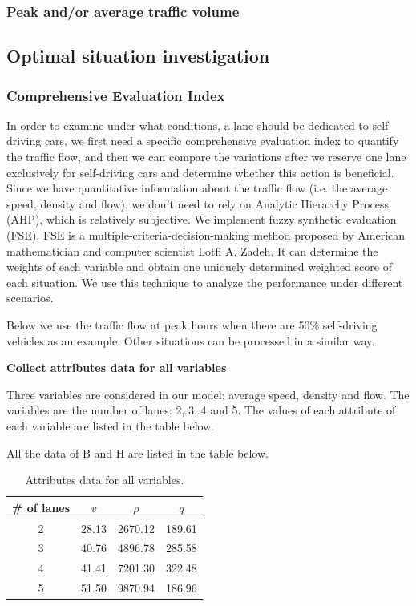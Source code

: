 \documentclass[a4paper]{article}
\begin{document}
	\subsubsection{Peak and/or average traffic volume }%

	\subsection{Optimal situation investigation}
	\subsubsection{Comprehensive Evaluation Index}
	In order to examine under what conditions, a lane should be dedicated to self-driving cars, we first need a specific comprehensive evaluation index to quantify the traffic flow, and then we can compare the variations after we reserve one lane exclusively for self-driving cars and determine whether this action is beneficial. Since we have quantitative information about the traffic flow (i.e. the average speed, density and flow), we don’t need to rely on Analytic Hierarchy Process (AHP), which is relatively subjective. We implement fuzzy synthetic evaluation (FSE)\cite{fse}. FSE is a multiple-criteria-decision-making method proposed by American mathematician and computer scientist Lotfi A. Zadeh. It can determine the weights of each variable and obtain one uniquely determined weighted score of each situation. We use this technique to analyze the performance under different scenarios.

	Below we use the traffic flow at peak hours when there are 50\% self-driving vehicles as an example. Other situations can be processed in a similar way.

	\textbf{Collect attributes data for all variables}

	Three variables are considered in our model: average speed, density and flow. The variables are the number of lanes: 2, 3, 4 and 5. The values of each attribute of each variable are listed in the table below.

	All the data of B and H are listed in the table below.
\begin{table}[H]
	\begin{center}
		\begin{tabular}{c|ccc}
		\hline
		\# of lanes & $v$   & $\rho$ & $q$ \\
		\hline
		2     & 28.13  & 2670.12  & 189.61  \\
		3     & 40.76  & 4896.78  & 285.58  \\
		4     & 41.41  & 7201.30  & 322.48  \\
		5     & 51.50  & 9870.94  & 186.96  \\
		\hline
		\end{tabular}
	\caption{Attributes data for all variables.}
	\end{center}
\end{table}
\end{document}
